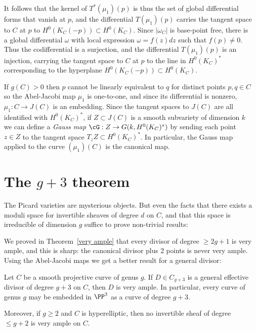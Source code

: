 It follows that
the kernel of $T^*(\mu_1)(p)$ is thus the set of global differential forms that vanish at $p$,
and the differential $T(\mu_1)(p)$ carries the tangent space to $C$ at $p$ to $H^0(K_C(-p)) \subset H^0(K_C)$. Since $|\omega_C|$ is  base-point free, there is a global differential $\omega$ 
with local expression $\omega = f(z)dz$ such that $f(p) \neq 0$. Thus the codifferential is a surjection, and  the
differential $T(\mu_1)(p)$ is an injection, carrying the tangent space to $C$ at $p$ to the line
in $H^0(K_C)^*$ corresponding to the hyperplane $H^0(K_C(-p))\subset H^0(K_C)$.

If $g(C)>0$ then $p$ cannot be linearly equivalent to $q$ for distinct points $p, q \in C$ so the Abel-Jacobi map $\mu_1$ is one-to-one, and since its differential is nonzero, $\mu_1 : C \to J(C)$ is an embedding. Since the tangent spaces to $J(C)$ are all identified with $H^0(K_C)^*$, if $Z \subset J(C)$ is a smooth subvariety of dimension $k$ we can define a \emph{Gauss map} $\cG : Z \to G(k, H^0(K_C)^*)$ by sending each point $z \in Z$ to the tangent space $T_zZ\subset H^0(K_C)^*$.
In particular, the Gauss map applied to the curve $(\mu_1)(C)$ is the canonical map.


\section{The $g+3$ theorem}\label{g+3 section}


The Picard varieties are mysterious objects.  But even the facts that there exists a  moduli space for invertible sheaves of degree $d$ on $C$, and that this space is irreducible of dimension $g$ suffice to prove non-trivial results: 

We proved in Theorem~\ref{very ample} that every divisor of degree $\geq 2g+1$ is very ample, and this is sharp: the canonical divisor plus 2 points is never very ample. Using the Abel-Jacobi maps we get a better result for a general divisor:

\begin{theorem}[$g+3$ theorem]\label{g+3 theorem}
Let $C$ be a smooth projective curve of genus $g$. If $D \in C_{g+3}$ is a general effective divisor of degree $g+3$ on $C$, then 
$D$ is very ample. In particular, every curve of genus $g$ may be embedded in $\PP^{3}$ as a curve of degree $g+3$. 

Moreover, if $g\geq 2$ and $C$ is hyperelliptic, then no invertible sheaf of degree $\leq g+2$ is very ample on $C$.
\end{theorem}

